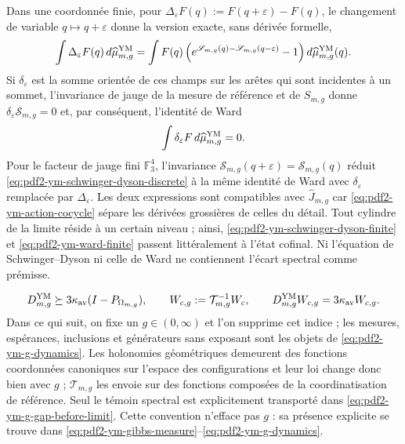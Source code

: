 Dans une coordonnée finie, pour $\Delta_\varepsilon F(q):=F(q+\varepsilon)-F(q)$, le changement de variable $q\mapsto q+\varepsilon$ donne la version exacte, sans dérivée formelle,
\begin{equation}\label{eq:pdf2-ym-schwinger-dyson-discrete}
 \int\Delta_\varepsilon F(q)\,d\widehat\mu_{m,g}^{\rm YM}
 =\int F(q)
  \left(e^{\mathscr S_{m,g}(q)-\mathscr S_{m,g}(q-\varepsilon)}-1\right)
  d\widehat\mu_{m,g}^{\rm YM}(q).
\end{equation}
Si $\delta_\varepsilon$ est la somme orientée de ces champs sur les arêtes qui
sont incidentes à un sommet, l’invariance de jauge de la mesure de référence et de
$S_{m,g}$ donne $\delta_\varepsilon\mathscr S_{m,g}=0$ et, par conséquent, l’identité de Ward
\begin{equation}\label{eq:pdf2-ym-ward-finite}
 \int\delta_\varepsilon F\,d\widehat\mu_{m,g}^{\rm YM}=0.
\end{equation}
Pour le facteur de jauge fini $\mathbb F_3^4$, l'invariance $\mathscr S_{m,g}(q+\varepsilon)=\mathscr S_{m,g}(q)$ réduit \eqref{eq:pdf2-ym-schwinger-dyson-discrete} à la même identité de Ward avec $\delta_\varepsilon$ remplacée par $\Delta_\varepsilon$. Les deux expressions sont compatibles avec $\widehat J_{m,g}$ car \eqref{eq:pdf2-ym-action-cocycle} sépare les dérivées grossières de celles du détail. Tout cylindre de la limite réside à un certain niveau ; ainsi, \eqref{eq:pdf2-ym-schwinger-dyson-finite} et \eqref{eq:pdf2-ym-ward-finite} passent littéralement à l'état cofinal. Ni l'équation de Schwinger--Dyson ni celle de Ward ne contiennent l'écart spectral comme prémisse.

\begin{equation}\label{eq:pdf2-ym-g-gap-before-limit}
 D_{m,g}^{\rm YM}\succeq3\kappa_{\rm av}
 (I-P_{\Omega_{m,g}}),
 \qquad
 W_{c,g}:=\mathcal T_{m,g}^{-1}W_c,
 \qquad
 D_{m,g}^{\rm YM}W_{c,g}=3\kappa_{\rm av}W_{c,g}.
\end{equation}
Dans ce qui suit, on fixe un $g\in(0,\infty)$ et l'on supprime cet indice ; les mesures, espérances, inclusions et générateurs sans exposant sont les objets de \eqref{eq:pdf2-ym-g-dynamics}. Les holonomies géométriques demeurent des fonctions coordonnées canoniques sur l'espace des configurations et leur loi change donc bien avec $g$ ; $\mathcal T_{m,g}$ les envoie sur des fonctions composées de la coordinatisation de référence. Seul le témoin spectral est explicitement transporté dans \eqref{eq:pdf2-ym-g-gap-before-limit}. Cette convention n'efface pas $g$ : sa présence explicite se trouve dans \eqref{eq:pdf2-ym-gibbs-measure}--\eqref{eq:pdf2-ym-g-dynamics}.

